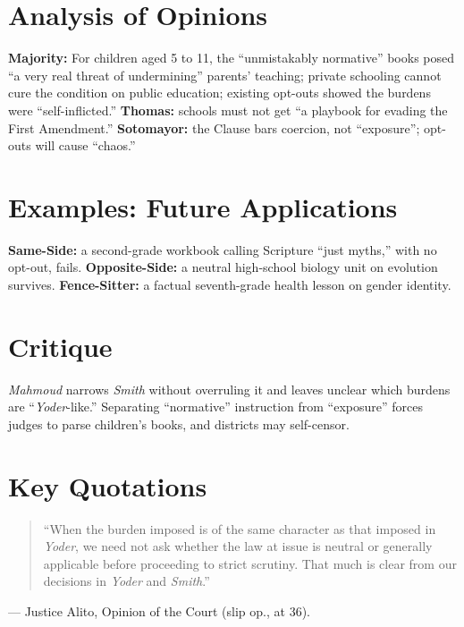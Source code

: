 \documentclass[12pt]{article}
\begin{document}
\section{Analysis of Opinions}
\textbf{Majority:} For children aged 5 to 11, the ``unmistakably normative'' books posed ``a very real threat of undermining'' parents' teaching; private schooling cannot cure the condition on public education; existing opt-outs showed the burdens were ``self-inflicted.'' \textbf{Thomas:} schools must not get ``a playbook for evading the First Amendment.'' \textbf{Sotomayor:} the Clause bars coercion, not ``exposure''; opt-outs will cause ``chaos.''

\section{Examples: Future Applications}
\textbf{Same-Side:} a second-grade workbook calling Scripture ``just myths,'' with no opt-out, fails. \textbf{Opposite-Side:} a neutral high-school biology unit on evolution survives. \textbf{Fence-Sitter:} a factual seventh-grade health lesson on gender identity.

\section{Critique}
\textit{Mahmoud} narrows \textit{Smith} without overruling it and leaves unclear which burdens are ``\textit{Yoder}-like.'' Separating ``normative'' instruction from ``exposure'' forces judges to parse children's books, and districts may self-censor.

\section{Key Quotations}
\begin{quote}
``When the burden imposed is of the same character as that imposed in \textit{Yoder}, we need not ask whether the law at issue is neutral or generally applicable before proceeding to strict scrutiny. That much is clear from our decisions in \textit{Yoder} and \textit{Smith}.''
\end{quote}
\noindent --- Justice Alito, Opinion of the Court (slip op., at 36).
\end{document}
